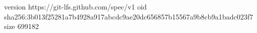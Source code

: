 version https://git-lfs.github.com/spec/v1
oid sha256:3b013f25281a7b4928a917abcdc9ae20dc656857b15567a9b8cb9a1badc023f7
size 699182
